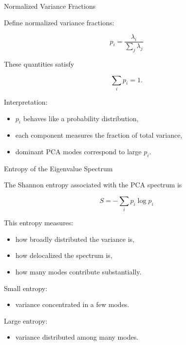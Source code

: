 \documentclass{beamer}
\begin{document}
\begin{frame}{Normalized Variance Fractions}

Define normalized variance fractions:

\[
p_i = \frac{\lambda_i}{\sum_j \lambda_j}
\]

\vspace{0.4cm}

These quantities satisfy

\[
\sum_i p_i = 1.
\]

\vspace{0.4cm}

Interpretation:

\begin{itemize}
    \item $p_i$ behaves like a probability distribution,
    \item each component measures the fraction of total variance,
    \item dominant PCA modes correspond to large $p_i$.
\end{itemize}

\end{frame}

\begin{frame}{Entropy of the Eigenvalue Spectrum}

The Shannon entropy associated with the PCA spectrum is

\[
S = -\sum_i p_i \log p_i
\]

\vspace{0.5cm}

This entropy measures:

\begin{itemize}
    \item how broadly distributed the variance is,
    \item how delocalized the spectrum is,
    \item how many modes contribute substantially.
\end{itemize}

\vspace{0.5cm}

Small entropy:
\begin{itemize}
    \item variance concentrated in a few modes.
\end{itemize}

Large entropy:
\begin{itemize}
    \item variance distributed among many modes.
\end{itemize}

\end{frame}
\end{document}
